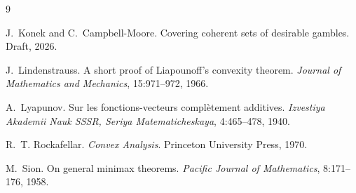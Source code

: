 \documentclass[11pt]{article}
\theoremstyle{plain}
\theoremstyle{definition}
\theoremstyle{remark}
\begin{document}
\begin{thebibliography}{9}

J.~Konek and C.~Campbell-Moore.
\newblock Covering coherent sets of desirable gambles.
\newblock Draft, 2026.

J.~Lindenstrauss.
\newblock A short proof of {L}iapounoff's convexity theorem.
\newblock \emph{Journal of Mathematics and Mechanics}, 15:971--972, 1966.

A.~Lyapunov.
\newblock Sur les fonctions-vecteurs compl\`etement additives.
\newblock \emph{Izvestiya Akademii Nauk SSSR, Seriya Matematicheskaya}, 4:465--478,
1940.

R.~T. Rockafellar.
\newblock \emph{Convex Analysis}.
\newblock Princeton University Press, 1970.

M.~Sion.
\newblock On general minimax theorems.
\newblock \emph{Pacific Journal of Mathematics}, 8:171--176, 1958.

\end{thebibliography}
\end{document}
